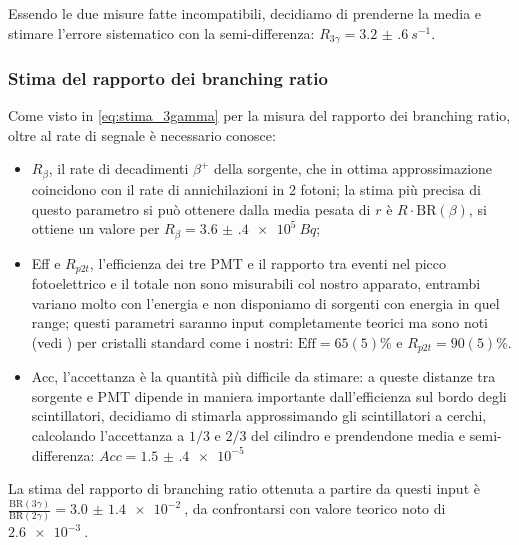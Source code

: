 Essendo le due misure fatte incompatibili, decidiamo di prenderne la media e stimare l'errore sistematico con la semi-differenza: $R_{3\gamma} = \SI{3.2(6)}{s^{-1}}$.

\subsubsection{Stima del rapporto dei branching ratio}
Come visto in \autoref{eq:stima_3gamma} per la misura del rapporto dei branching ratio, oltre al rate di segnale è necessario conosce:
\begin{itemize}
	\item $R_{\beta}$, il rate di decadimenti $\beta^+$ della sorgente, che in ottima approssimazione coincidono con il rate di annichilazioni in 2 fotoni; la stima più precisa di questo parametro si può ottenere dalla media pesata di $r$ è $R \cdot \text{BR}(\beta)$, si ottiene un valore per $R_{\beta} = \SI{3.6(4)e5}{Bq}$;
	\item Eff e $R_{p2t}$, l'efficienza dei tre PMT e il rapporto tra eventi nel picco fotoelettrico e il totale non sono misurabili col nostro apparato, entrambi variano molto con l'energia e non disponiamo di sorgenti con energia in quel range; questi parametri saranno input completamente teorici ma sono noti (vedi \cite{knoll}) per cristalli standard come i nostri: $\text{Eff} = 65(5)\%$ e $R_{p2t} = 90(5)\%$.
	\item Acc, l'accettanza è la quantità più difficile da stimare: a queste distanze tra sorgente e PMT dipende in maniera importante dall'efficienza sul bordo degli scintillatori, decidiamo di stimarla approssimando gli scintillatori a cerchi, calcolando l'accettanza a $1/3$ e $2/3$ del cilindro e prendendone media e semi-differenza: $Acc = \SI{1.5(4)e-5}{}$ 
\end{itemize}


La stima del rapporto di branching ratio ottenuta a partire da questi input è $\frac{\text{BR}(3\gamma)}{\text{BR}(2\gamma)} = \SI{3.0(14)e-2}{}$, da confrontarsi con valore teorico noto di $\SI{2.6e-3}{}$.


